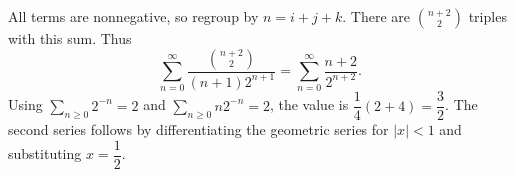 All terms are nonnegative, so regroup by $n=i+j+k$. There are $\binom{n+2}{2}$ triples with this sum. Thus
\[\sum_{n=0}^{\infty}\dfrac{\binom{n+2}{2}}{(n+1)2^{n+1}}=\sum_{n=0}^{\infty}\dfrac{n+2}{2^{n+2}}.\]
Using $\sum_{n\ge0}2^{-n}=2$ and $\sum_{n\ge0}n2^{-n}=2$, the value is $\dfrac{1}{4}(2+4)=\boxed{\dfrac{3}{2}}$. The second series follows by differentiating the geometric series for $|x|<1$ and substituting $x=\dfrac{1}{2}$.
